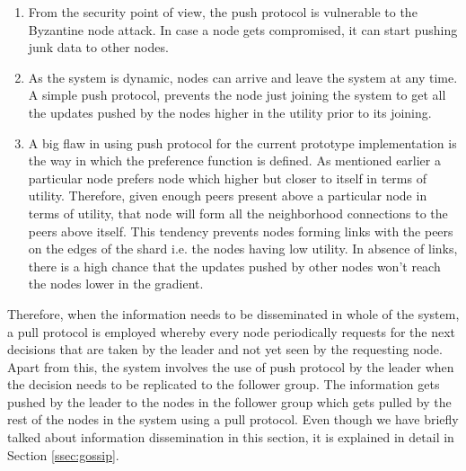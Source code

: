 \documentclass[12pt,a4paper,twoside,openright]{book}
\begin{document}
\begin{enumerate}

\item From the security point of view, the push protocol is vulnerable to the Byzantine node attack. In case a node gets compromised, it can start pushing junk data to other nodes.


\item As the system is dynamic, nodes can arrive and leave the system at any time. A simple push protocol, prevents the node just joining the system to get all the updates pushed by the nodes higher in the utility prior to its joining.

\item A big flaw in using push protocol for the current prototype implementation is the way in which the preference function is defined. As mentioned earlier a particular node prefers node which higher but closer to itself in terms of utility. Therefore, given enough peers present above a particular node in terms of utility, that node will form all the neighborhood connections to the peers above itself. This tendency prevents nodes forming links with the peers on the edges of the shard i.e. the nodes having low utility. In absence of links, there is a high chance that the updates pushed by other nodes won't reach the nodes lower in the gradient.

\end{enumerate} 

Therefore, when the information needs to be disseminated in whole of the system, a pull protocol is employed whereby every node periodically requests for the next decisions that are taken by the leader and not yet seen by the requesting node. Apart from this, the system involves the use of push protocol by the leader when the decision needs to be replicated to the follower group. The information gets pushed by the leader to the nodes in the follower group which gets pulled by the rest of the nodes in the system using a pull protocol. Even though we have briefly talked about information dissemination in this section, it is explained in detail in Section 
\ref{ssec:gossip}.
\end{document}
